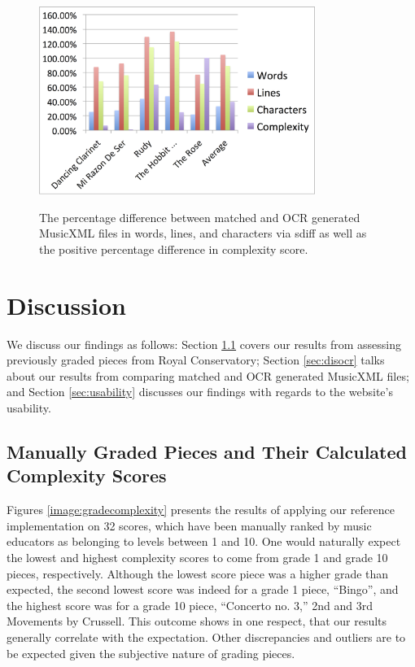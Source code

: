 \documentclass[12pt]{report}
\begin{document}
\begin{figure}
	\centering
		\caption{The percentage difference between matched and OCR generated MusicXML files in words, lines, and characters via sdiff as well as the positive percentage difference in complexity score.}
		\includegraphics[width=0.8\textwidth]{PercentageOCR.png}
		\label{image:percentage}
\end{figure}

\chapter{Discussion} 
\label{sec:discus}

We discuss our findings as follows: Section \ref{sec:grades} covers our results from assessing previously graded pieces from Royal Conservatory; Section \ref{sec:disocr} talks about our results from comparing matched and OCR generated MusicXML files; and Section \ref{sec:usability} discusses our findings with regards to the website's usability.

\section{Manually Graded Pieces and Their Calculated Complexity Scores}
\label{sec:grades}

Figures \ref{image:gradecomplexity} presents the results of applying our reference implementation on 32 scores, which have been manually ranked by music educators as belonging to levels between 1 and 10. 
One would naturally expect the lowest and highest complexity scores to come from grade 1 and grade 10 pieces, respectively. Although the lowest score piece was a higher grade than expected, the second lowest score was indeed for a grade 1 piece, ``Bingo'', and the highest score was for a grade 10 piece, ``Concerto no. 3,'' 2nd and 3rd Movements by Crussell. This outcome shows in one respect, that our results generally correlate with the expectation. Other discrepancies and outliers are to be expected given the subjective nature of grading pieces.
\end{document}
